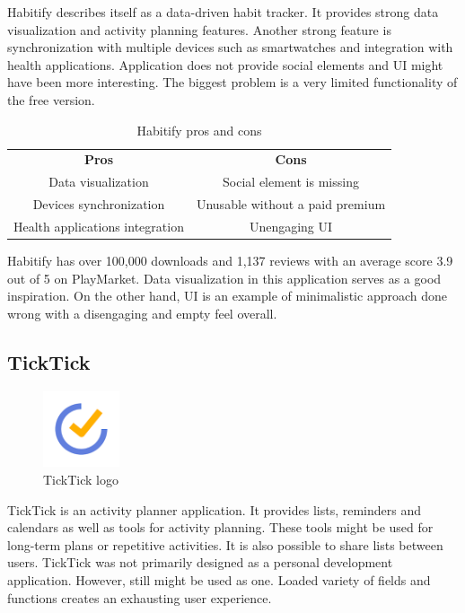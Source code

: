 Habitify describes itself as a data-driven habit tracker.
It provides strong data visualization and activity planning features.
Another strong feature is synchronization with multiple devices such as smartwatches and integration with health applications.
Application does not provide social elements and UI might have been more interesting.
The biggest problem is a very limited functionality of the free version.

\begin{table}[h!]
    \centering
    \begin{ctucolortab}
        \begin{tabular}{cc}
            \bfseries Pros & \bfseries Cons\\\Midrule
            Data visualization & Social element is missing\\
            Devices synchronization & Unusable without a paid premium\\
            Health applications integration & Unengaging UI \\
        \end{tabular}
    \end{ctucolortab}
    \caption{Habitify pros and cons}\label{tab:habitify-pros-cons}
\end{table}

Habitify has over 100,000 downloads and 1,137 reviews with an average score 3.9 out of 5 on PlayMarket.
Data visualization in this application serves as a good inspiration.
On the other hand, UI is an example of minimalistic approach done wrong with a disengaging and empty feel overall.


\subsection{TickTick}\label{subsec:ticktick}

\begin{figure}[h!]
    \includegraphics[width=0.20\textwidth]{images/ticktick-logo}
    \caption{TickTick logo~\cite{ticktick-logo}}
    \label{fig:ticktick-logo}
\end{figure}

TickTick is an activity planner application.
It provides lists, reminders and calendars as well as tools for activity planning.
These tools might be used for long-term plans or repetitive activities.
It is also possible to share lists between users.
TickTick was not primarily designed as a personal development application.
However, still might be used as one.
Loaded variety of fields and functions creates an exhausting user experience.

